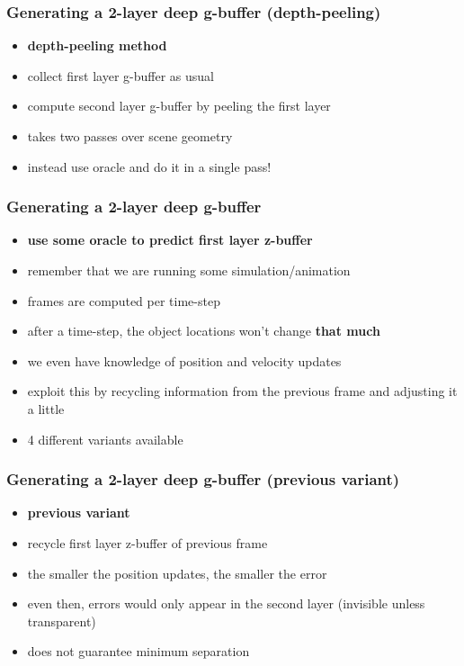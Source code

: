 \documentclass[aspectratio=169]{beamer}
\begin{document}
	\begin{frame}
		\frametitle{Generating a 2-layer deep g-buffer (depth-peeling)}
		\begin{itemize}
			\item \textbf{depth-peeling method}
			\item collect first layer g-buffer as usual
			\item compute second layer g-buffer by peeling the first layer
			\item takes two passes over scene geometry\pause
			\item instead use oracle and do it in a single pass!
		\end{itemize}
	\end{frame}	

	\begin{frame}
		\frametitle{Generating a 2-layer deep g-buffer}
		\begin{itemize}
			\item \textbf{use some oracle to predict first layer z-buffer}
			\item remember that we are running some simulation/animation
			\item frames are computed per time-step
			\item after a time-step, the object locations won't change \textbf{that much}
			\item we even have knowledge of position and velocity updates
			\item exploit this by recycling information from the previous frame and adjusting it a little
			\item 4 different variants available
			
		\end{itemize}
	\end{frame}	

	\begin{frame}
		\frametitle{Generating a 2-layer deep g-buffer (previous variant)}
		\begin{itemize}
			\item \textbf{previous variant}
			\item recycle first layer z-buffer of previous frame
			\item the smaller the position updates, the smaller the error
			\item even then, errors would only appear in the second layer (invisible unless transparent)
			\item does not guarantee minimum separation
		\end{itemize}
	\end{frame}	
\end{document}

